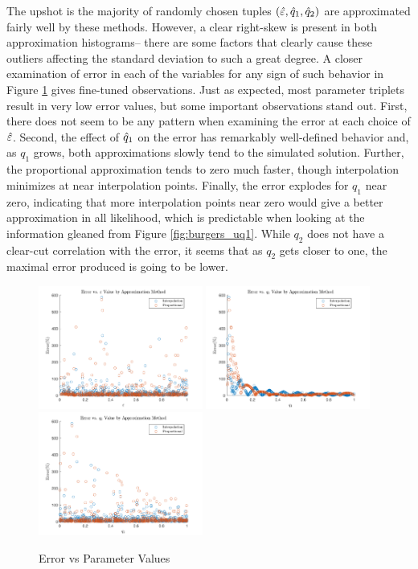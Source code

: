 \documentclass[12pt]{article}
\newcommand{\eps}{\varepsilon}
\begin{document}
    The upshot is the majority of randomly chosen tuples $(\Hat{\eps},\Hat{q}_1,\Hat{q}_2)$ are approximated fairly well by these methods. However, a clear right-skew is present in both approximation histograms-- there are some factors that clearly cause these outliers affecting the standard deviation to such a great degree. A closer examination of error in each of the variables for any sign of such behavior in Figure \ref{fig:error_vals} gives fine-tuned observations. Just as expected, most parameter triplets result in very low error values, but some important observations stand out. First, there does not seem to be any pattern when examining the error at each choice of $\Hat{\eps}$. Second, the effect of $\Hat{q}_1$ on the error has remarkably well-defined behavior and, as $q_1$ grows, both approximations slowly tend to the simulated solution. Further, the proportional approximation tends to zero much faster, though interpolation minimizes at near interpolation points. Finally, the error explodes for $q_1$ near zero, indicating that more interpolation points near zero would give a better approximation in all likelihood, which is predictable when looking at the information gleaned from Figure \ref{fig:burgers_uq1}. While $q_2$ does not have a clear-cut correlation with the error, it seems that as $q_2$ gets closer to one, the maximal error produced is going to be lower.
    \begin{figure}[h!]
        \centering
        \includegraphics[width=0.48\textwidth]{figures/eps_err.pdf}
        \includegraphics[width=0.48\textwidth]{figures/q1_err.pdf}
        \includegraphics[width=0.48\textwidth]{figures/q2_err.pdf}
        \caption{Error vs Parameter Values}
        \label{fig:error_vals}
    \end{figure}
    
\end{document}
